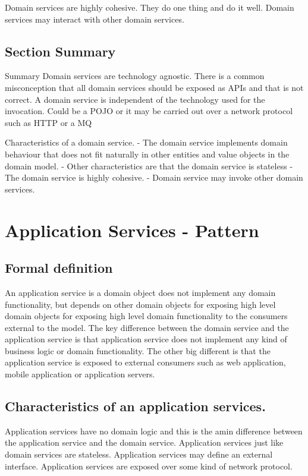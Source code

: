 Domain services are highly cohesive.
They do one thing and do it well.
Domain services may interact with other domain services.

\subsection{Section Summary}
Summary
Domain services are technology agnostic.
There is a common misconception that all domain services should be exposed as APIs and that is not correct.
A domain service is independent of the technology used for the invocation.
Could be a POJO or it may be carried out over a network protocol such as HTTP or a MQ

Characteristics of a domain service.
- The domain service implements domain behaviour that does not fit naturally in other entities and value objects in the domain model.
- Other characteristics are that the domain service is stateless
- The domain service is highly cohesive.
- Domain service may invoke other domain services.


\section{Application Services - Pattern}
\subsection{Formal definition}
An application service is a domain object does not implement any domain functionality,
but depends on other domain objects for exposing high level domain objects for exposing high level domain functionality to the consumers external to the model.
The key difference between the domain service and the application service is that application service does not implement any kind of business logic or domain functionality.
The other big different is that the application service is exposed to external consumers such as web application, mobile application or application servers.

\subsection{Characteristics of an application services.}
Application services have no domain logic and this is the amin difference between the application service and the domain service.
Application services just like domain services are stateless.
Application services may define an external interface.
Application services are exposed over some kind of network protocol.

